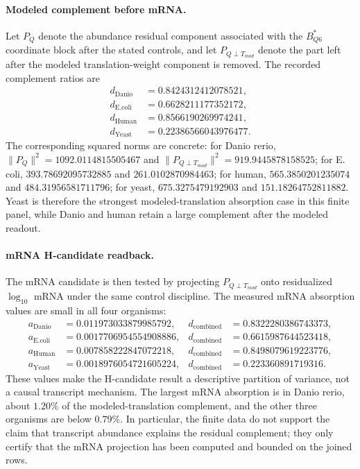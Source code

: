 \paragraph{Modeled complement before mRNA.} Let $P_Q$ denote the abundance residual component associated with the $B^*_{Q6}$ coordinate block after the stated controls, and let $P_{Q\perp T_{mod}}$ denote the part left after the modeled translation-weight component is removed.  The recorded complement ratios are
$$\begin{aligned}
 d_{\mathrm{Danio}} &= 0.8424312412078521,\\
 d_{\mathrm{E.coli}} &= 0.6628211177352172,\\
 d_{\mathrm{Human}} &= 0.8566190269974241,\\
 d_{\mathrm{Yeast}} &= 0.22386566043976477.
\end{aligned}$$
The corresponding squared norms are concrete: for Danio rerio, $\|P_Q\|^2=1092.0114815505467$ and $\|P_{Q\perp T_{mod}}\|^2=919.9445878158525$; for E. coli, $393.78692095732885$ and $261.0102870984463$; for human, $565.3850201235074$ and $484.31956581711796$; for yeast, $675.3275479192903$ and $151.18264752811882$.  Yeast is therefore the strongest modeled-translation absorption case in this finite panel, while Danio and human retain a large complement after the modeled readout.

\paragraph{mRNA H-candidate readback.} The mRNA candidate is then tested by projecting $P_{Q\perp T_{mod}}$ onto residualized $\log_{10}$ mRNA under the same control discipline.  The measured mRNA absorption values are small in all four organisms:
$$\begin{aligned}
 a_{\mathrm{Danio}} &= 0.011973033879985792, & d_{\mathrm{combined}} &= 0.8322280386743373,\\
 a_{\mathrm{E.coli}} &= 0.0017706954554908886, & d_{\mathrm{combined}} &= 0.6615987644523418,\\
 a_{\mathrm{Human}} &= 0.007858222847072218, & d_{\mathrm{combined}} &= 0.8498079619223776,\\
 a_{\mathrm{Yeast}} &= 0.0018976054721605224, & d_{\mathrm{combined}} &= 0.223360891719316.
\end{aligned}$$
These values make the H-candidate result a descriptive partition of variance, not a causal transcript mechanism.  The largest mRNA absorption is in Danio rerio, about $1.20\%$ of the modeled-translation complement, and the other three organisms are below $0.79\%$.  In particular, the finite data do not support the claim that transcript abundance explains the residual complement; they only certify that the mRNA projection has been computed and bounded on the joined rows.

